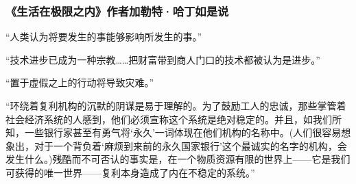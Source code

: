 \subsubsection*{《生活在极限之内》作者加勒特·哈丁如是说}

“人类认为将要发生的事能够影响所发生的事。”
\par

“技术进步已成为一种宗教……把财富带到商人门口的技术都被认为是进步。”
\par

“置于虚假之上的行动将导致灾难。”
\par

“环绕着复利机构的沉默的阴谋是易于理解的。为了鼓励工人的忠诚，那些掌管着社会经济系统的人感到，他们必须宣称这个系统是绝对稳定的。并且，如我们所知，一些银行家甚至有勇气将‘永久’一词体现在他们机构的名称中。(人们很容易想象出，对于一个背负着‘麻烦到来前的永久国家银行’这个最诚实的名字的机构，会发生什么。)残酷而不可否认的事实是，在一个物质资源有限的世界上——它是我们可获得的唯一世界——复利本身造成了内在不稳定的系统。”
\par
